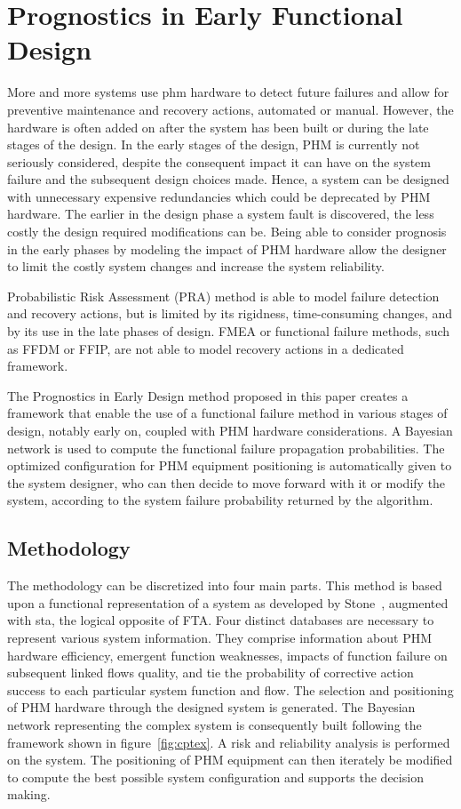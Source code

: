 \section{Prognostics in Early Functional Design}

More and more systems use \gls{phm} hardware to detect future failures and allow for preventive maintenance and recovery actions, automated or manual. However, the hardware is often added on after the system has been built or during the late stages of the design. In the early stages of the design, PHM is currently not seriously considered, despite the consequent impact it can have on the system failure and the subsequent design choices made. Hence, a system can be designed with unnecessary expensive redundancies which could be deprecated by PHM hardware. The earlier in the design phase a system fault is discovered, the less costly the design required modifications can be. Being able to consider prognosis in the early phases by modeling the impact of PHM hardware allow the designer to limit the costly system changes and increase the system reliability.

Probabilistic Risk Assessment (PRA) method is able to model failure detection and recovery actions, but is limited by its rigidness, time-consuming changes, and by its use in the late phases of design. FMEA or functional failure methods, such as FFDM or FFIP, are not able to model recovery actions in a dedicated framework.

The Prognostics in Early Design method proposed in this paper creates a framework that enable the use of a functional failure method in various stages of design, notably early on, coupled with PHM hardware considerations. A Bayesian network is used to compute the functional failure propagation probabilities. The optimized configuration for PHM equipment positioning is automatically given to the system designer, 
who can then decide to move forward with it or modify the system, according to the system failure probability returned by the algorithm.


\subsection{Methodology}

The methodology can be discretized into four main parts. This method is based upon a functional representation of a system as developed by Stone~\cite{stone}, augmented with \gls{sta}, the logical opposite of FTA. Four distinct databases are necessary to represent various system information. They comprise information about PHM hardware efficiency, emergent function weaknesses, impacts of function failure on subsequent linked flows quality, and tie the probability of corrective action success to each particular system function and flow. The selection and positioning of PHM hardware through the designed system is generated. The Bayesian network representing the complex system is consequently built following the framework shown in figure~\ref{fig:cptex}. A risk and reliability analysis is performed on the system. The positioning of PHM equipment can then iterately be modified to compute the best possible system configuration and supports the decision making.



